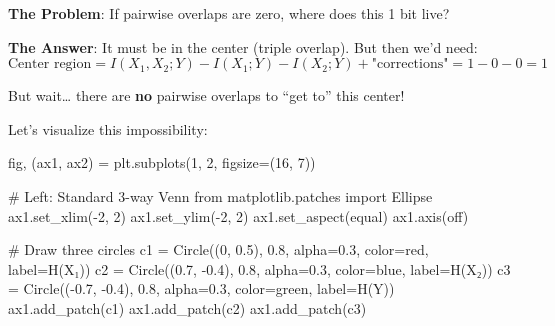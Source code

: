 \documentclass[
  11pt,
  letterpaper,
  oneside,
  openany]{book}
\newenvironment{Shaded}{\begin{snugshade}}{\end{snugshade}}
\newcommand{\CommentTok}[1]{\textcolor[rgb]{0.37,0.37,0.37}{#1}}
\newcommand{\DecValTok}[1]{\textcolor[rgb]{0.68,0.00,0.00}{#1}}
\newcommand{\FloatTok}[1]{\textcolor[rgb]{0.68,0.00,0.00}{#1}}
\newcommand{\ImportTok}[1]{\textcolor[rgb]{0.00,0.46,0.62}{#1}}
\newcommand{\NormalTok}[1]{\textcolor[rgb]{0.00,0.23,0.31}{#1}}
\newcommand{\OperatorTok}[1]{\textcolor[rgb]{0.37,0.37,0.37}{#1}}
\newcommand{\StringTok}[1]{\textcolor[rgb]{0.13,0.47,0.30}{#1}}
\begin{document}
\textbf{The Problem}: If pairwise overlaps are zero, where does this 1
bit live?

\textbf{The Answer}: It must be in the center (triple overlap). But then
we'd need:
\[\text{Center region} = I(X_1, X_2; Y) - I(X_1; Y) - I(X_2; Y) + \text{"corrections"} = 1 - 0 - 0 = 1\]

But wait\ldots{} there are \textbf{no} pairwise overlaps to ``get to''
this center!

Let's visualize this impossibility:

\begin{Shaded}
\begin{Highlighting}[]
\NormalTok{fig, (ax1, ax2) }\OperatorTok{=}\NormalTok{ plt.subplots(}\DecValTok{1}\NormalTok{, }\DecValTok{2}\NormalTok{, figsize}\OperatorTok{=}\NormalTok{(}\DecValTok{16}\NormalTok{, }\DecValTok{7}\NormalTok{))}

\CommentTok{\# Left: Standard 3{-}way Venn}
\ImportTok{from}\NormalTok{ matplotlib.patches }\ImportTok{import}\NormalTok{ Ellipse}
\NormalTok{ax1.set\_xlim(}\OperatorTok{{-}}\DecValTok{2}\NormalTok{, }\DecValTok{2}\NormalTok{)}
\NormalTok{ax1.set\_ylim(}\OperatorTok{{-}}\DecValTok{2}\NormalTok{, }\DecValTok{2}\NormalTok{)}
\NormalTok{ax1.set\_aspect(}\StringTok{\textquotesingle{}equal\textquotesingle{}}\NormalTok{)}
\NormalTok{ax1.axis(}\StringTok{\textquotesingle{}off\textquotesingle{}}\NormalTok{)}

\CommentTok{\# Draw three circles}
\NormalTok{c1 }\OperatorTok{=}\NormalTok{ Circle((}\DecValTok{0}\NormalTok{, }\FloatTok{0.5}\NormalTok{), }\FloatTok{0.8}\NormalTok{, alpha}\OperatorTok{=}\FloatTok{0.3}\NormalTok{, color}\OperatorTok{=}\StringTok{\textquotesingle{}red\textquotesingle{}}\NormalTok{, label}\OperatorTok{=}\StringTok{\textquotesingle{}H(X₁)\textquotesingle{}}\NormalTok{)}
\NormalTok{c2 }\OperatorTok{=}\NormalTok{ Circle((}\FloatTok{0.7}\NormalTok{, }\OperatorTok{{-}}\FloatTok{0.4}\NormalTok{), }\FloatTok{0.8}\NormalTok{, alpha}\OperatorTok{=}\FloatTok{0.3}\NormalTok{, color}\OperatorTok{=}\StringTok{\textquotesingle{}blue\textquotesingle{}}\NormalTok{, label}\OperatorTok{=}\StringTok{\textquotesingle{}H(X₂)\textquotesingle{}}\NormalTok{)}
\NormalTok{c3 }\OperatorTok{=}\NormalTok{ Circle((}\OperatorTok{{-}}\FloatTok{0.7}\NormalTok{, }\OperatorTok{{-}}\FloatTok{0.4}\NormalTok{), }\FloatTok{0.8}\NormalTok{, alpha}\OperatorTok{=}\FloatTok{0.3}\NormalTok{, color}\OperatorTok{=}\StringTok{\textquotesingle{}green\textquotesingle{}}\NormalTok{, label}\OperatorTok{=}\StringTok{\textquotesingle{}H(Y)\textquotesingle{}}\NormalTok{)}
\NormalTok{ax1.add\_patch(c1)}
\NormalTok{ax1.add\_patch(c2)}
\NormalTok{ax1.add\_patch(c3)}


\end{Highlighting}
\end{Shaded}
\end{document}
